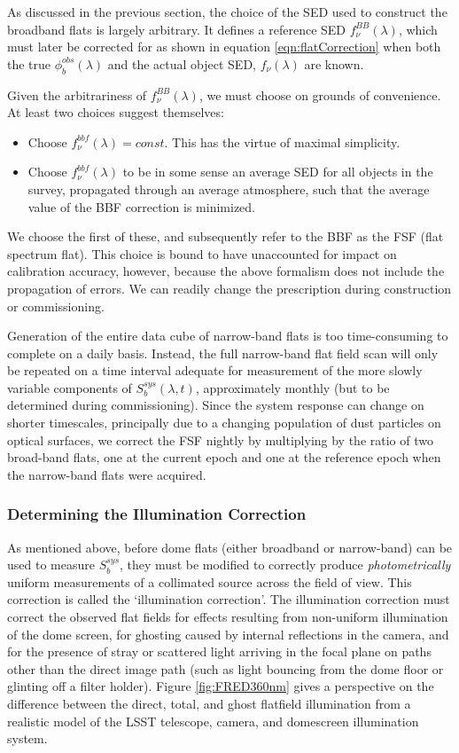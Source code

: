 \documentclass[12pt,preprint]{aastex}
\begin{document}
As discussed in the previous section, the choice of the SED used to construct the broadband flats is largely arbitrary.  It defines a reference SED $f_\nu^{BB}(\lambda)$,
which must later be corrected for as shown in equation \ref{eqn:flatCorrection}
when both the true $\phi_b^{obs}(\lambda)$ and the actual object SED, $f_\nu(\lambda)$ are known.     

Given the arbitrariness of $f_\nu^{BB}(\lambda)$,
we must choose on grounds of convenience.  At least two choices suggest themselves:

\begin{itemize}
\item{Choose $f_\nu^{bbf}(\lambda) = const$.  This has the virtue of maximal simplicity.}
\item{Choose $f_\nu^{bbf}(\lambda)$ to be in some sense an average SED for all objects in the survey, propagated
through an average atmosphere,  such that the average value
of the BBF correction is minimized.}
\end{itemize}

We choose the first of these, and subsequently refer to the BBF as the FSF (flat spectrum flat).  This choice is bound
to have unaccounted for impact on calibration accuracy, however, because the above formalism does not include the
propagation of errors.  We can readily change the prescription during construction or commissioning.


Generation of the entire data cube of
narrow-band flats is too time-consuming to complete on a daily
basis. Instead, the full narrow-band flat field scan will only be
repeated on a time interval adequate for measurement of
the more slowly variable components of $S_b^{sys}(\lambda,t)$, approximately
monthly (but to be determined during commissioning).   Since the system response can change 
on shorter timescales, principally due to a changing population of dust particles on optical surfaces, we correct the FSF
nightly by multiplying by the ratio of two broad-band flats, one at the current epoch and one at the 
reference epoch when the narrow-band flats were acquired.

\subsubsection{Determining the Illumination Correction}
\label{sec:ic}
As mentioned above, before dome flats (either
broadband or narrow-band) can be used to measure
$S_b^{sys}$, they must be modified to correctly produce {\it
photometrically} uniform measurements of a collimated source 
across the field of view. This correction is called the
`illumination correction'.  The illumination correction must correct
the observed flat fields for effects resulting from non-uniform
illumination of the dome screen, for ghosting caused by internal
reflections in the camera, and for the presence of stray or scattered
light arriving in the focal plane on paths other than the direct
image path (such as light bouncing from the dome floor or glinting
off a filter holder). Figure \ref{fig:FRED360nm} gives a perspective
on the difference between the direct, total, and ghost flatfield 
illumination from a realistic model of the LSST telescope, camera,
and domescreen illumination system.
\end{document}
